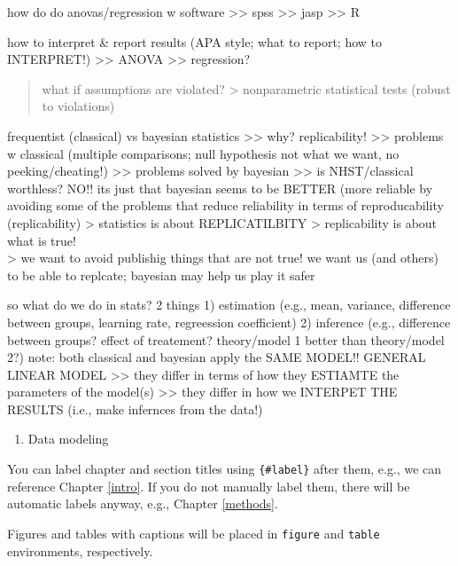 \documentclass[
]{book}
\providecommand{\tightlist}{%
  \setlength{\itemsep}{0pt}\setlength{\parskip}{0pt}}
\begin{document}
how do do anovas/regression w software
\textgreater\textgreater{} spss
\textgreater\textgreater{} jasp
\textgreater\textgreater{} R

how to interpret \& report results (APA style; what to report; how to INTERPRET!)
\textgreater\textgreater{} ANOVA
\textgreater\textgreater{} regression?

\begin{quote}
what if assumptions are violated?
\textgreater{} nonparametric statistical tests (robust to violations)
\end{quote}

frequentist (classical) vs bayesian statistics
\textgreater\textgreater{} why? replicability!
\textgreater\textgreater{} problems w classical (multiple comparisons; null hypothesis not what we want, no peeking/cheating!)
\textgreater\textgreater{} problems solved by bayesian
\textgreater\textgreater{} is NHST/classical worthless? NO!! its just that bayesian seems to be BETTER (more reliable by avoiding some of the problems that reduce reliability in terms of reproducability (replicability)
\textgreater{} statistics is about REPLICATILBITY
\textgreater{} replicability is about what is true!\\
\textgreater{} we want to avoid publishig things that are not true! we want us (and others) to be able to replcate; bayesian may help us play it safer

so what do we do in stats? 2 things
1) estimation (e.g., mean, variance, difference between groups, learning rate, regreession coefficient)
2) inference (e.g., difference between groups? effect of treatement? theory/model 1 better than theory/model 2?)
note: both classical and bayesian apply the SAME MODEL!! GENERAL LINEAR MODEL
\textgreater\textgreater{} they differ in terms of how they ESTIAMTE the parameters of the model(s)
\textgreater\textgreater{} they differ in how we INTERPET THE RESULTS (i.e., make infernces from the data!)

\begin{enumerate}
\def\labelenumi{\arabic{enumi})}
\setcounter{enumi}{4}
\tightlist
\item
  Data modeling
\end{enumerate}

You can label chapter and section titles using \texttt{\{\#label\}} after them, e.g., we can reference Chapter \ref{intro}. If you do not manually label them, there will be automatic labels anyway, e.g., Chapter \ref{methods}.

Figures and tables with captions will be placed in \texttt{figure} and \texttt{table} environments, respectively.
\end{document}
